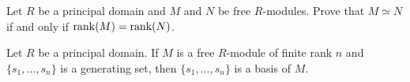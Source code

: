 \begin{exercise}
    Let $R$ be a principal domain 
    and $M$ and $N$ be free $R$-modules. Prove that 
    $M\simeq N$ if and only if $\operatorname{rank}(M)=\operatorname{rank}(N)$. 	
\end{exercise}

\begin{exercise}
\label{xca:base}
    Let $R$ be a principal domain. 
    If $M$ is a free $R$-module of finite rank $n$ and $\{s_1,\dots,s_n\}$ 
    is a generating set, then $\{s_1,\dots,s_n\}$ is a basis of $M$.
\end{exercise}





